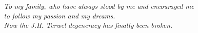 \begin{dedication}
\textit{To my family, who have always stood by me and encouraged me\\to follow my passion and my dreams.\\Now the J.H. Terwel degeneracy has finally been broken.}
\end{dedication}

